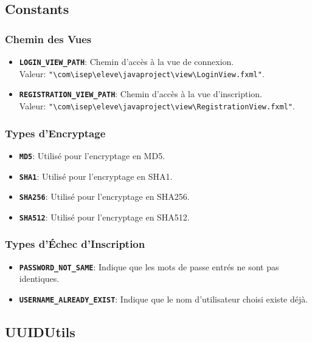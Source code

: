 \documentclass{article}
\begin{document}
\subsection{Constants}
\subsubsection{Chemin des Vues}
\begin{itemize}
  \item \textbf{\texttt{LOGIN\_VIEW\_PATH}}: Chemin d'accès à la vue de connexion.\\ Valeur:  \texttt{"\textbackslash com\textbackslash isep\textbackslash eleve\textbackslash javaproject\textbackslash view\textbackslash LoginView.fxml"}.
  \item \textbf{\texttt{REGISTRATION\_VIEW\_PATH}}: Chemin d'accès à la vue d'inscription. \\ Valeur:
  \texttt{"\textbackslash com\textbackslash isep\textbackslash eleve\textbackslash javaproject\textbackslash view\textbackslash RegistrationView.fxml"}.
\end{itemize}

\subsubsection{Types d'Encryptage}
\begin{itemize}
  \item \textbf{\texttt{MD5}}: Utilisé pour l'encryptage en MD5.
  \item \textbf{\texttt{SHA1}}: Utilisé pour l'encryptage en SHA1.
  \item \textbf{\texttt{SHA256}}: Utilisé pour l'encryptage en SHA256.
  \item \textbf{\texttt{SHA512}}: Utilisé pour l'encryptage en SHA512.
\end{itemize}

\subsubsection{Types d'Échec d'Inscription}
\begin{itemize}
  \item \textbf{\texttt{PASSWORD\_NOT\_SAME}}: Indique que les mots de passe entrés ne sont pas identiques.
  \item \textbf{\texttt{USERNAME\_ALREADY\_EXIST}}: Indique que le nom d'utilisateur choisi existe déjà.
\end{itemize}
\subsection{UUIDUtils}
\end{document}
